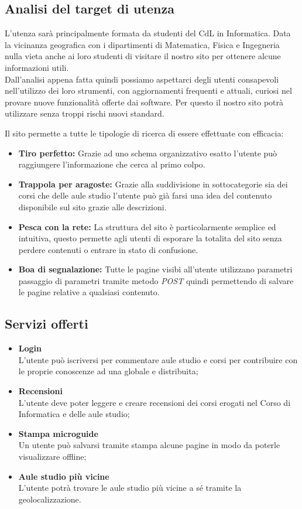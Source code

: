 \subsection{Analisi del target di utenza}

L'utenza sarà principalmente formata da studenti del CdL in Informatica. Data la vicinanza geografica con i dipartimenti di Matematica, Fisica e Ingegneria nulla vieta anche ai loro studenti di visitare il nostro sito per ottenere alcune informazioni utili.\\
Dall'analisi appena fatta quindi possiamo aspettarci degli utenti consapevoli nell'utilizzo dei loro strumenti, con aggiornamenti frequenti e attuali, curiosi nel provare nuove funzionalità offerte dai software. Per questo il nostro sito potrà utilizzare senza troppi rischi nuovi standard.

Il sito permette a tutte le tipologie di ricerca di essere effettuate con
efficacia:
\begin{itemize}
    \item \textbf{Tiro perfetto:} Grazie ad uno schema organizzativo esatto
        l'utente può raggiungere l'informazione che cerca al primo colpo.
    \item \textbf{Trappola per aragoste: } Grazie alla suddivisione in
        sottocategorie sia dei corsi che delle aule studio l'utente può già
        farsi una idea del contenuto disponibile sul sito grazie alle
        descrizioni.
    \item \textbf{Pesca con la rete:} La struttura del sito è particolarmente
        semplice ed intuitiva, questo permette agli utenti di esporare la
        totalita del sito senza perdere contenuti o entrare in stato di
        confusione.
    \item \textbf{Boa di segnalazione:} Tutte le pagine visibi all'utente
        utilizzano parametri passaggio di parametri tramite metodo
        \textit{POST} quindi permettendo di salvare le pagine relative a
        qualsiasi contenuto.
\end{itemize}

\subsection{Servizi offerti}
\begin{itemize}
    \item \textbf{Login} \\ L'utente può iscriversi per commentare aule studio e corsi per contribuire con le proprie conoscenze ad una globale e distribuita;
    \item \textbf{Recensioni} \\L'utente deve poter leggere e creare recensioni dei corsi erogati nel Corso di Informatica e delle aule studio;
    \item \textbf{Stampa microguide} \\ Un utente può salvarsi tramite stampa alcune pagine in modo da poterle visualizzare offline;
    \item \textbf{Aule studio più vicine} \\ L'utente potrà trovare le aule studio più vicine a sé tramite la geolocalizzazione.
\end{itemize}
